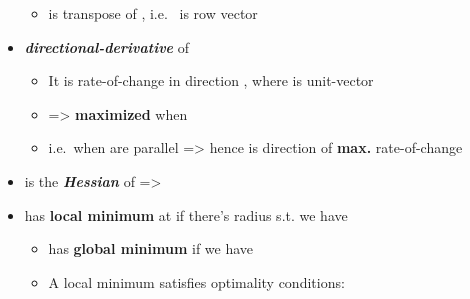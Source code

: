 \begin{itemize}
\begin{itemize}
          \item
                 is transpose of
                , i.e.~ is row vector
        \end{itemize}
  \item
        \textbf{\emph{directional-derivative}} of 

        \begin{itemize}

          \item
                It is rate-of-change in direction , where
                 is unit-vector
          \item
                =\textgreater{} 
                \textbf{maximized} when 
          \item
                i.e.~when  are parallel =\textgreater{}
                hence  is direction of \textbf{max.}
                rate-of-change
        \end{itemize}
  \item
         is
        the \textbf{\emph{Hessian}} of  =\textgreater{}
  \item
         has \textbf{local minimum} at
         if there's radius 
        s.t.  we
        have 

        \begin{itemize}

          \item
                 has \textbf{global minimum}
                 if
                 we have
          \item
                A local minimum satisfies optimality conditions:


\end{itemize}
\end{itemize}
